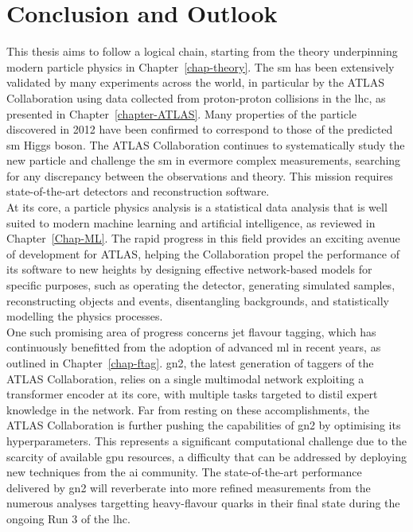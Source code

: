 \chapter{\color{oxfordblue} Conclusion and Outlook}\label{chap-Conclusion}
\ChapFrame
\vspace{-1cm}
This thesis aims to follow a logical chain, starting from the theory underpinning modern particle physics in Chapter~\ref{chap-theory}. The \gls{sm} has been extensively validated by many experiments across the world, in particular by the ATLAS Collaboration using data collected from proton-proton collisions in the \gls{lhc}, as presented in Chapter~\ref{chapter-ATLAS}. Many properties of the particle discovered in 2012 have been confirmed to correspond to those of the predicted \gls{sm} Higgs boson. The ATLAS Collaboration continues to systematically study the new particle and challenge the \gls{sm} in evermore complex measurements, searching for any discrepancy between the observations and theory. This mission requires state-of-the-art detectors and reconstruction software. \\

At its core, a particle physics analysis is a statistical data analysis that is well suited to modern machine learning and artificial intelligence, as reviewed in Chapter~\ref{Chap-ML}. The rapid progress in this field provides an exciting avenue of development for ATLAS, helping the Collaboration propel the performance of its software to new heights by designing effective network-based models for specific purposes, such as operating the detector, generating simulated samples, reconstructing objects and events, disentangling backgrounds, and statistically modelling the physics processes. \\

One such promising area of progress concerns jet flavour tagging, which has continuously benefitted from the adoption of advanced \gls{ml} in recent years, as outlined in Chapter~\ref{chap-ftag}. \gls{gn2}, the latest generation of taggers of the ATLAS Collaboration, relies on a single multimodal network exploiting a transformer encoder at its core, with multiple tasks targeted to distil expert knowledge in the network. Far from resting on these accomplishments, the ATLAS Collaboration is further pushing the capabilities of \gls{gn2} by optimising its hyperparameters. This represents a significant computational challenge due to the scarcity of available \gls{gpu} resources, a difficulty that can be addressed by deploying new techniques from the \gls{ai} community. The state-of-the-art performance delivered by \gls{gn2} will reverberate into more refined measurements from the numerous analyses targetting heavy-flavour quarks in their final state during the ongoing Run 3 of the \gls{lhc}.  \\

